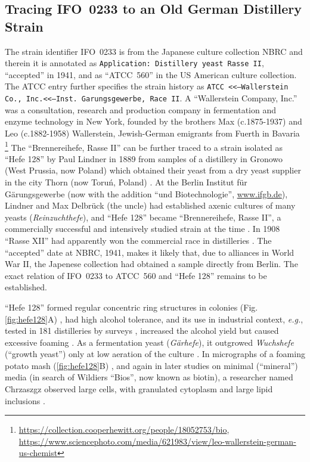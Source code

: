 \documentclass[11pt,a4paper,english]{article}
\newcommand{\ifo}{IFO~0233}
\newcommand{\eg}[0]{\textit{e.g.}}
\let\cite\citep
\begin{document}
\subsection{Tracing \ifo{} to an Old German Distillery Strain}
The strain identifier \ifo{} is from the Japanese
culture collection NBRC and therein it is annotated as \texttt{Application:
  Distillery yeast Rasse II}, ``accepted'' in 1941, and as ``ATCC~560'' in
the US American culture collection. The ATCC entry further specifies
the strain history as \texttt{ATCC <<--Wallerstein Co.,
  Inc.<<--Inst. Garungsgewerbe, Race II}.  A ``Wallerstein Company,
Inc.''  was a consultation, research and production company in
fermentation and enzyme technology in New York, founded by the
brothers Max (c.1875-1937) and Leo (c.1882-1958) Wallerstein,
Jewish-German emigrants from Fuerth in
Bavaria \footnote{\url{https://collection.cooperhewitt.org/people/18052753/bio},\\ \url{https://www.sciencephoto.com/media/621983/view/leo-wallerstein-german-us-chemist}}
The ``Brennereihefe, Rasse II'' can be further traced to a strain
isolated as ``Hefe 128'' by Paul Lindner in 1889 from samples of a
distillery in Gronowo (West Prussia, now Poland) which obtained their
yeast from a dry yeast supplier in the city Thorn (now Toru\'n,
Poland) \cite{Lindner1895}. At the Berlin Institut f\"ur
G\"arungsgewerbe (now with the addition ``und Biotechnologie'',
\url{www.ifgb.de}), Lindner and Max Delbr\"uck (the uncle) had
established axenic cultures of many yeasts (\textit{Reinzuchthefe}),
and ``Hefe 128'' became ``Brennereihefe, Rasse II'', a commercially
successful and intensively studied strain at the time
\cite{Lindner1895, Lindner1919}. In 1908 ``Rasse XII'' had apparently
won the commercial race in distilleries \cite{Kohl1908}.  The
``accepted'' date at NBRC, 1941, makes it likely that, due to
alliances in World War II, the Japenese collection had obtained a
sample directly from Berlin. The exact relation of \ifo{} to ATCC~560
and ``Hefe 128'' remains to be established.

``Hefe 128'' formed regular concentric ring structures in colonies
(Fig. \ref{fig:hefe128}A) \cite{Lindner1895}, had high alcohol tolerance, and
its use in industrial context, \eg{}, tested in 181 distilleries by
surveys \cite{Dingler1894}, increased the alcohol yield but caused
excessive foaming \cite{Behrend1900}. As a fermentation yeast
(\textit{G\"arhefe}), it outgrowed \textit{Wuchshefe} (``growth
yeast'') only at low aeration of the culture \cite{Haehn1952}.
%
In micrographs of a foaming potato mash (\ref{fig:hefe128}B)
\cite{Lindner1903}, and again in later studies on minimal (``mineral'')
media (in search of Wildiers ``Bios'', now known as biotin), a
researcher named Chrzaszgz observed large cells, with granulated
cytoplasm and large lipid inclusions \cite{Lindner1919}.
%
%
\end{document}
